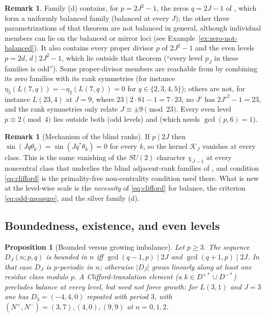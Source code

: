 \documentclass[11pt]{article}
\newtheorem{proposition}[theorem]{Proposition}
\theoremstyle{definition}
\newtheorem{remark}[theorem]{Remark}
\newcommand{\cK}{\mathcal K}
\begin{document}
\begin{remark}
\label{rem:family-b-versus-paper1}
Family (d) contains, for $p=2J^2-1$, the zeros $q=2J-1$ of
\cite[Thm.~7.1]{MahmoodP1Collection2026}, which form a uniformly
balanced family (balanced at every $J$); the other three
parametrizations of that theorem are not balanced in general, although
individual members can lie on the balanced or mirror loci (see
Example~\ref{ex:zero-not-balanced}).  It also contains every proper
divisor $p$ of $2J^2-1$ and the even levels $p=2d$, $d\mid2J^2-1$, which
lie outside that theorem (``every level $p_J$ in these families is
odd'').  Some proper-divisor members are reachable from
\cite{MahmoodP1Collection2026} by combining its zero families with its
rank symmetries (for instance $\eta_5(L(7,q))=-\eta_2(L(7,q))=0$ for
$q\in\{2,3,4,5\}$); others
are not, for instance $L(23,4)$ at $J=9$, where $23\mid2\cdot81-1=7\cdot23$,
no $J'$ has $2J'^2-1=23$, and the rank symmetries only relate
$J\equiv\pm9\pmod{23}$.  Every even level $p\equiv2\pmod4$ lies outside
both \cite[Thm.~7.1]{MahmoodP1Collection2026} (odd levels) and
\cite[Thm.~6.2]{MahmoodP1Collection2026} (which needs $\gcd(p,6)=1$).
\end{remark}

\begin{remark}[Mechanism of the blind ranks]
If $p\mid2J$ then $\sin(Jq\theta_k)=\sin(Jq^*\theta_k)=0$ for every $k$,
so the kernel $\cK_J$ vanishes at every class.  This is the same vanishing
of the $SU(2)$ character $\chi_{J-1}$ at every noncentral class that
underlies the blind adjacent-rank families of
\cite{MahmoodP7Collection2026}, and condition \eqref{eq:clifford} is the
primality-free non-centrality condition used there.  What is new at the
level-wise scale is the \emph{necessity} of \eqref{eq:clifford} for
balance, the criterion \eqref{eq:odd-measure}, and the silver family (d).
\end{remark}

\subsection{Boundedness, existence, and even levels}

\begin{proposition}[Bounded versus growing imbalance]
\label{prop:bounded}
Let $p\geq3$.  The sequence $D_J(n;p,q)$ is bounded in $n$ iff
$\gcd(q-1,p)\mid2J$ and $\gcd(q+1,p)\mid2J$.  In that case $D_J$ is
$p$-periodic in $n$; otherwise $|D_J|$ grows linearly along at least one
residue class modulo $p$.  A Clifford-translation element (a $k\in D^{+*}\cup D^{-*}$)
precludes balance at every level, but need not force growth: for
$L(3,1)$ and $J=3$ one has $D_3=(-4,4,0)$ repeated with period $3$, with
$(N^+,N^-)=(3,7),(4,0),(9,9)$ at $n=0,1,2$.
\end{proposition}
\end{document}
